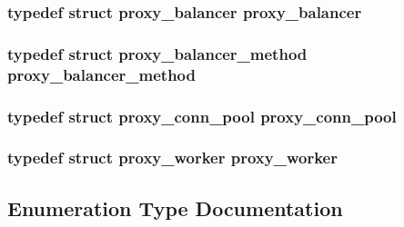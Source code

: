 \subsubsection[{\texorpdfstring{proxy\+\_\+balancer}{proxy_balancer}}]{\setlength{\rightskip}{0pt plus 5cm}typedef struct {\bf proxy\+\_\+balancer} {\bf proxy\+\_\+balancer}}\hypertarget{group__MOD__PROXY_ga71f18e64e75843f565a2676dbee30b27}{}\label{group__MOD__PROXY_ga71f18e64e75843f565a2676dbee30b27}
\subsubsection[{\texorpdfstring{proxy\+\_\+balancer\+\_\+method}{proxy_balancer_method}}]{\setlength{\rightskip}{0pt plus 5cm}typedef struct {\bf proxy\+\_\+balancer\+\_\+method} {\bf proxy\+\_\+balancer\+\_\+method}}\hypertarget{group__MOD__PROXY_gae890583042aae45f2462322d529b7e4a}{}\label{group__MOD__PROXY_gae890583042aae45f2462322d529b7e4a}
\subsubsection[{\texorpdfstring{proxy\+\_\+conn\+\_\+pool}{proxy_conn_pool}}]{\setlength{\rightskip}{0pt plus 5cm}typedef struct {\bf proxy\+\_\+conn\+\_\+pool} {\bf proxy\+\_\+conn\+\_\+pool}}\hypertarget{group__MOD__PROXY_ga2a945e05af935856b17b4ef7079a3ad5}{}\label{group__MOD__PROXY_ga2a945e05af935856b17b4ef7079a3ad5}
\subsubsection[{\texorpdfstring{proxy\+\_\+worker}{proxy_worker}}]{\setlength{\rightskip}{0pt plus 5cm}typedef struct {\bf proxy\+\_\+worker} {\bf proxy\+\_\+worker}}\hypertarget{group__MOD__PROXY_ga10d75bffd076f4f3e5da8f28c098c2b1}{}\label{group__MOD__PROXY_ga10d75bffd076f4f3e5da8f28c098c2b1}


\subsection{Enumeration Type Documentation}
